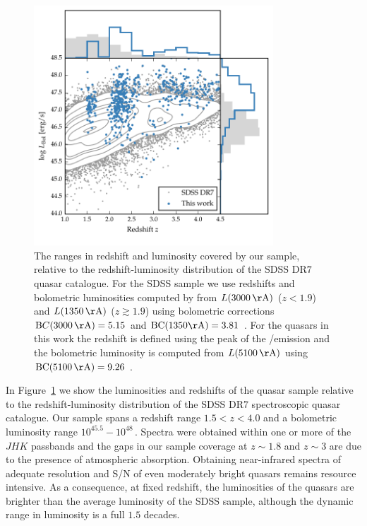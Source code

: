 \begin{figure}[h!]
    \centering
    \includegraphics[width=0.8\textwidth]{figures/chapter02/luminosity_z.pdf} 
    \caption[{The redshift and luminosity distribution of our sample.}]{The ranges in redshift and luminosity covered by our sample, relative to the redshift-luminosity distribution of the SDSS DR$7$ quasar catalogue. For the SDSS sample we use \citet{hewett10} redshifts and bolometric luminosities computed by \citet{shen11} from $L(3000\,{\mathrm \AA})$ ($z < 1.9$) and $L(1350\,{\mathrm \AA})$ ($z \gtrsim 1.9$) using bolometric corrections ${\mathrm BC}(3000\,{\mathrm \AA})=5.15$ and $\text{BC}(1350{\mathrm \AA})=3.81$ \citep{richards06}. For the quasars in this work the redshift is defined using the peak of the \hans/\hb emission and the bolometric luminosity is computed from $L(5100\,{\mathrm \AA})$ using $\text{BC}(5100\,{\mathrm \AA})=9.26$ \citep{richards06}.}     
    \label{fig:lzplane}
\end{figure}

In Figure~\ref{fig:lzplane} we show the luminosities and redshifts of the quasar sample relative to the redshift-luminosity distribution of the SDSS DR$7$ spectroscopic quasar catalogue.
Our sample spans a redshift range $1.5 < z < 4.0$ and a bolometric luminosity range $10^{45.5}-10^{48}$\,\ergs. 
Spectra were obtained within one or more of the $JHK$ passbands and the gaps in our sample coverage at $z\sim1.8$ and $z\sim3$ are due to the presence of atmospheric absorption. 
Obtaining near-infrared spectra of adequate resolution and S/N of even moderately bright quasars remains resource intensive. 
As a consequence, at fixed redshift, the luminosities of the quasars are brighter than the average luminosity of the SDSS sample, although the dynamic range in luminosity is a full $1.5$ decades.

